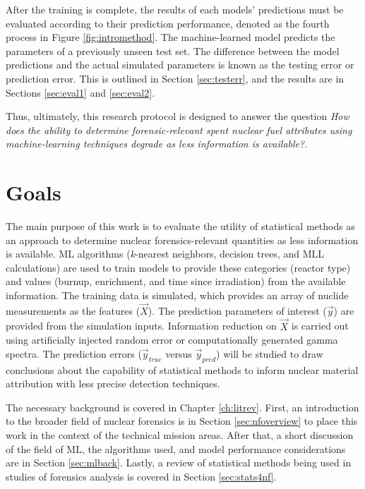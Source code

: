 After the training is complete, the results of each models' predictions must be
evaluated according to their prediction performance, denoted as the fourth
process in Figure \ref{fig:intromethod}.  The machine-learned model predicts
the parameters of a previously unseen test set.  The difference between the
model predictions and the actual simulated parameters is known as the testing
error or prediction error. This is outlined in Section \ref{sec:testerr}, and
the results are in Sections \ref{sec:eval1} and \ref{sec:eval2}.

Thus, ultimately, this research protocol is designed to answer the question
\textit{How does the ability to determine forensic-relevant spent nuclear fuel
attributes using machine-learning techniques degrade as less information is
available?}. 

\section{Goals}

The main purpose of this work is to evaluate the utility of statistical methods
as an approach to determine nuclear forensics-relevant quantities as less
information is available. \Gls{ML} algorithms (\textit{k}-nearest neighbors,
decision trees, and \gls{MLL} calculations) are used to train models to provide
these categories (reactor type) and values (burnup, enrichment, and time since
irradiation) from the available information.  The training data is simulated,
which provides an array of nuclide measurements as the features ($\vec{X}$).
The prediction parameters of interest ($\vec{y}$) are provided from the
simulation inputs. Information reduction on $\vec{X}$ is carried out using
artificially injected random error or computationally generated gamma spectra.
The prediction errors ($\vec{y}_{true}$ versus $\vec{y}_{pred}$) will be
studied to draw conclusions about the capability of statistical methods to
inform nuclear material attribution with less precise detection techniques.

The necessary background is covered in Chapter \ref{ch:litrev}.  First, an
introduction to the broader field of nuclear forensics is in Section
\ref{sec:nfoverview} to place this work in the context of the technical mission
areas. After that, a short discussion of the field of \gls{ML}, the algorithms
used, and model performance considerations are in Section \ref{sec:mlback}.
Lastly, a review of statistical methods being used in studies of forensics
analysis is covered in Section \ref{sec:stats4nf}. 

